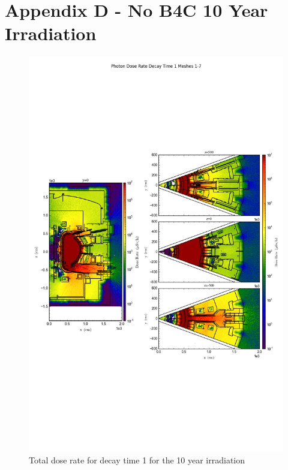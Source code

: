 \documentclass[12pt]{article}
\begin{document}
\section{Appendix D - No B4C 10 Year Irradiation}
\begin{figure}[ht!]
\centering
\includegraphics[trim={0cm 8cm, 0cm 8cm},clip,scale=0.75]{../plots/final_model/10year/Photon_Dose_Rate_Decay_Time_1_Meshes_1-7.png}
\caption{Total dose rate for decay time 1 for the 10 year irradiation}
\label{fig:photons_10y_dc1_nob4c_dose}
\end{figure}
\end{document}
